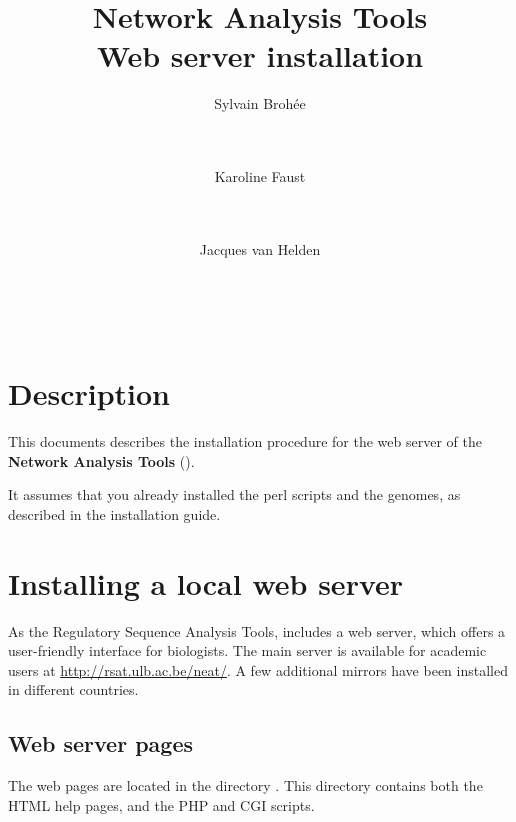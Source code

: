 \documentclass{book}
\begin{document}
\title{Network Analysis Tools \\
Web server installation}

\author{
	Sylvain Broh\'ee \\
	 \\
        \and \\
	Karoline Faust \\
	 \\
        \and \\
	Jacques van Helden \\
	\\
        \\
        \\
        \bigre
}


\maketitle

\newpage
\tableofcontents
\newpage

\section{Description}

This documents describes the installation procedure for the web server
of the \textbf{Network Analysis Tools} (\neat).

It assumes that you already installed the perl scripts and the
genomes, as described in the \RSAT installation guide.


\section{Installing a local web server}

As the Regulatory Sequence Analysis Tools, \neat includes a web server, which
offers a user-friendly interface for biologists. The main server is
available for academic users at \url{http://rsat.ulb.ac.be/neat/}. A
few additional mirrors have been installed in different countries.

\subsection{Web server pages}

The web pages are located in the directory
. This directory contains both the HTML help
pages, and the PHP and CGI scripts.
\end{document}
